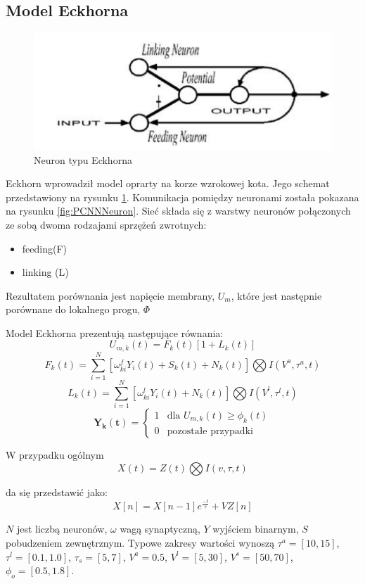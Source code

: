 \subsection{Model Eckhorna}
\begin{figure}[H]
	\centering
	\includegraphics[width=\textwidth*3/5]{../EckhornNeuron.png}
	\caption{Neuron typu Eckhorna } \label{fig:EckhornNeuron}
\end{figure}

Eckhorn wprowadził model oprarty na korze wzrokowej kota.
Jego schemat przedstawiony na rysunku \ref{fig:EckhornNeuron}.
Komunikacja pomiędzy neuronami została pokazana na rysunku \ref{fig:PCNNNeuron}.
Sieć składa się z warstwy neuronów połączonych ze sobą dwoma rodzajami sprzężeń zwrotnych:
\begin{itemize}
\item feeding(F)
\item linking (L)
\end{itemize}
Rezultatem porównania jest napięcie membrany, $U_m$, które jest następnie porównane do lokalnego progu, $\Phi$

Model Eckhorna prezentują następujące równania:
$$U_{m,k} (t)=F_k(t)[1+L_k (t)]$$
$$F_k(t)=\sum\limits_{i=1}^N [\omega_{ki}^f Y_i(t)+S_k(t)+N_k(t)]\bigotimes I (V^a, \tau^a,t)$$
$$L_k(t)=\sum\limits_{i=1}^N [\omega_{ki}^l Y_i(t)+N_k(t)]\bigotimes I (V^l, \tau^l,t)$$
$$ \mathbf{Y_k(t)} =
\left\{ \begin{array}{ll}
1 & \textrm{dla $U_{m,k}(t)\geq \phi_k(t)$}\\ 
0 & \textrm{pozostałe przypadki}
\end{array} \right.$$

W przypadku ogólnym
$$X(t)=Z(t)\bigotimes I(v,\tau,t)$$

da się przedstawić jako:
$$X[n] = X[n-1]e^{\frac{-t}{\tau}} + V Z[n] $$

$N$ jest liczbą neuronów, $\omega$ wagą synaptyczną, $Y$ wyjściem binarnym, $S$ pobudzeniem zewnętrznym.
Typowe zakresy wartości wynoszą $\tau^a=[10,15]$, $\tau^l=[0.1, 1.0]$, $\tau_s=[5,7]$, 
$V^a=0.5$, $V^l=[5,30]$, $V^s=[50,70]$, $\phi_o=[0.5,1.8]$.

